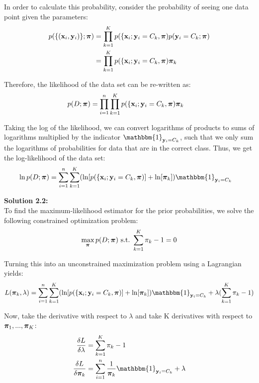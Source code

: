 \documentclass[submit]{harvardml}
\begin{document}
In order to calculate this probability, consider the probability of seeing one data point given the parameters:
\begin{align*}
    p(\{(\mathbf{x}_i, \mathbf{y}_i)\}; \boldsymbol{\pi}) &= \prod_{k=1}^{K} p(\{\mathbf{x}_i; \mathbf{y}_i = C_k, \boldsymbol{\pi}) p(\mathbf{y}_i = C_k; \boldsymbol{\pi})\\
    &= \prod_{k=1}^{K} p(\{\mathbf{x}_i; \mathbf{y}_i = C_k, \boldsymbol{\pi})  \boldsymbol{\pi}_k
\end{align*}

Therefore, the likelihood of the data set can be re-written as:
\begin{align*}
    p(D ; \boldsymbol{\pi}) &= \prod_{i=1}^{n} \prod_{k=1}^{K} p(\{\mathbf{x}_i; \mathbf{y}_i = C_k, \boldsymbol{\pi})  \boldsymbol{\pi}_k
\end{align*}

Taking the log of the likelihood, we can convert logarithms of products to sums of logarithms multiplied by the indicator $\mathbbm{1}_{\boldy_i = C_k}$, such that we only sum the logarithms of probabilities for data that are in the correct class. Thus, we get the log-likelihood of the data set:
\begin{align*}
    \ln p(D ; \bpi) &= \sum_{i=1}^{n} \sum_{k=1}^{K} (\ln[p(\{\boldx_i; \boldy_i = C_k, \bpi)] + \ln[\bpi_k]) \mathbbm{1}_{\boldy_i = C_k}
\end{align*}

\noindent\textbf{Solution 2.2:}\\
To find the maximum-likelihood estimator for the prior probabilities, we solve the following constrained optimization problem:
\begin{align*}
    \max_{\boldsymbol{\pi}} p(D ; \boldsymbol{\pi})\  \text{s.t.}\ \sum_{k=1}^{K}\pi_k - 1 = 0
\end{align*}

Turning this into an unconstrained maximization problem using a Lagrangian yields:
\begin{align*}
    L(\bpi_k, \lambda) = \sum_{i=1}^{n} \sum_{k=1}^{K} (\ln[p(\{\boldx_i; \boldy_i = C_k, \bpi)] + \ln[\bpi_k]) \mathbbm{1}_{\boldy_i = C_k} + \lambda ( \sum_{k=1}^{K}\pi_k - 1)
\end{align*}

Now, take the derivative with respect to $\lambda$ and take K derivatives with respect to $\boldsymbol{\pi}_1, ..., \boldsymbol{\pi}_K$:
\begin{align*}
    \frac{\delta L}{\delta \lambda} &= \sum_{k=1}^{K}\pi_k - 1\\
    \frac{\delta L}{\delta \bpi_k} &= \sum_{i=1}^{n} \frac{1}{\bpi_k} \mathbbm{1}_{\boldy_i = C_k} + \lambda
\end{align*}
\end{document}
